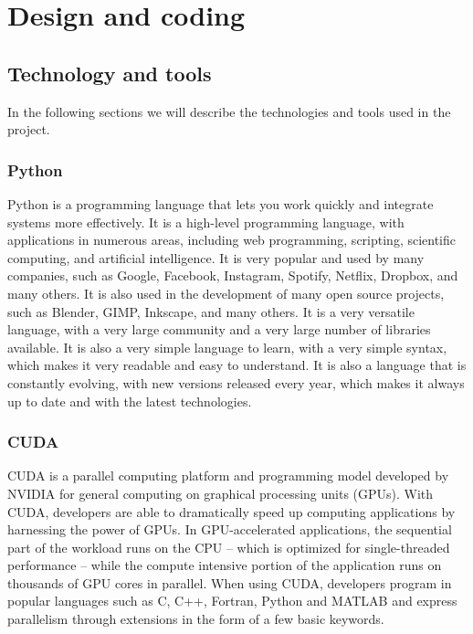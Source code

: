 \chapter{Design and coding}\label{cap:design-coding}


\section{Technology and tools}\label{sec:technology-tools}
In the following sections we will describe the technologies and tools used in
the project.
\subsection*{Python}\label{subsec:python}
Python is a programming language that lets you work quickly and integrate
systems more effectively. It is a high-level programming language, with
applications in numerous areas, including web programming, scripting, scientific
computing, and artificial intelligence. It is very popular and used by many
companies, such as Google, Facebook, Instagram, Spotify, Netflix, Dropbox, and
many others. It is also used in the development of many open source projects,
such as Blender, GIMP, Inkscape, and many others. It is a very versatile
language, with a very large community and a very large number of libraries
available. It is also a very simple language to learn, with a very simple
syntax, which makes it very readable and easy to understand. It is also a
language that is constantly evolving, with new versions released every year,
which makes it always up to date and with the latest technologies.

\subsection*{CUDA}\label{subsec:cuda}
CUDA is a parallel computing platform and programming model developed by NVIDIA
for general computing on graphical processing units (GPUs). With CUDA, developers
are able to dramatically speed up computing applications by harnessing the power
of GPUs. In GPU-accelerated applications, the sequential part of the workload
runs on the CPU – which is optimized for single-threaded performance – while the
compute intensive portion of the application runs on thousands of GPU cores in
parallel. When using CUDA, developers program in popular languages such as C,
C++, Fortran, Python and MATLAB and express parallelism through extensions in
the form of a few basic keywords.

